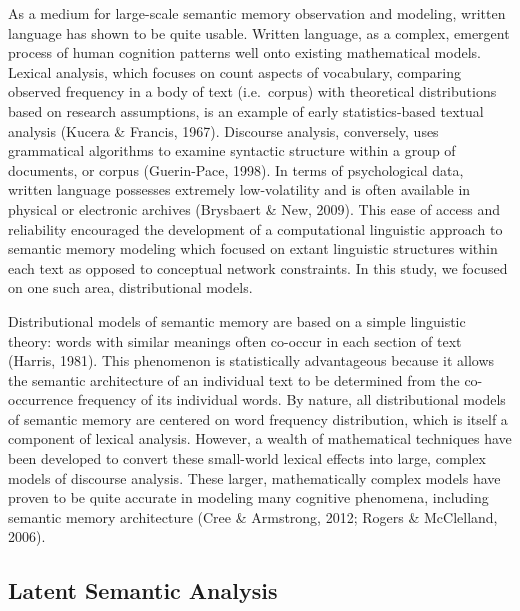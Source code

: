 \documentclass[english,man]{apa6}
\theoremstyle{definition}
\theoremstyle{definition}
\theoremstyle{definition}
\theoremstyle{remark}
\begin{document}
As a medium for large-scale semantic memory observation and modeling,
written language has shown to be quite usable. Written language, as a
complex, emergent process of human cognition patterns well onto existing
mathematical models. Lexical analysis, which focuses on count aspects of
vocabulary, comparing observed frequency in a body of text (i.e.~corpus)
with theoretical distributions based on research assumptions, is an
example of early statistics-based textual analysis (Kucera \& Francis,
1967). Discourse analysis, conversely, uses grammatical algorithms to
examine syntactic structure within a group of documents, or corpus
(Guerin-Pace, 1998). In terms of psychological data, written language
possesses extremely low-volatility and is often available in physical or
electronic archives (Brysbaert \& New, 2009). This ease of access and
reliability encouraged the development of a computational linguistic
approach to semantic memory modeling which focused on extant linguistic
structures within each text as opposed to conceptual network
constraints. In this study, we focused on one such area, distributional
models.

Distributional models of semantic memory are based on a simple
linguistic theory: words with similar meanings often co-occur in each
section of text (Harris, 1981). This phenomenon is statistically
advantageous because it allows the semantic architecture of an
individual text to be determined from the co-occurrence frequency of its
individual words. By nature, all distributional models of semantic
memory are centered on word frequency distribution, which is itself a
component of lexical analysis. However, a wealth of mathematical
techniques have been developed to convert these small-world lexical
effects into large, complex models of discourse analysis. These larger,
mathematically complex models have proven to be quite accurate in
modeling many cognitive phenomena, including semantic memory
architecture (Cree \& Armstrong, 2012; Rogers \& McClelland, 2006).
\newline

\subsection{Latent Semantic Analysis}\label{latent-semantic-analysis}
\end{document}
